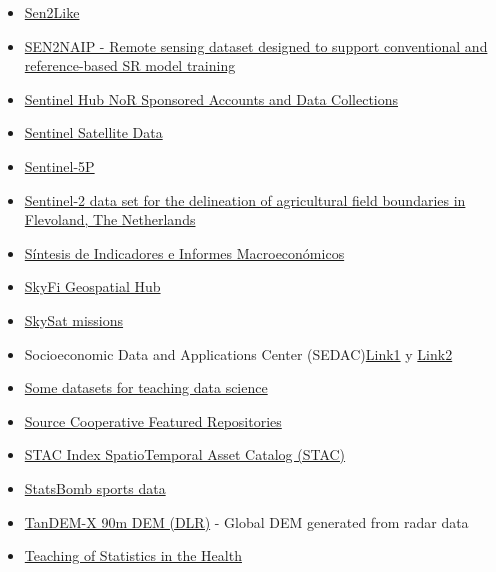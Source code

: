 \documentclass[
]{article}
\begin{document}
\begin{itemize}
{  images}
\item
  \href{https://docs.openeo.cloud/usecases/ard/sen2like/\#_1-sen2like-for-rgb}{Sen2Like}
\item
  \href{https://huggingface.co/datasets/isp-uv-es/SEN2NAIP}{SEN2NAIP -
  Remote sensing dataset designed to support conventional and
  reference-based SR model training}
\item
  \href{https://www.sentinel-hub.com/Network-of-Resources/}{Sentinel Hub
  NoR Sponsored Accounts and Data Collections}
\item
  \href{https://browser.dataspace.copernicus.eu}{Sentinel Satellite
  Data}
\item
  \href{https://developers.google.com/earth-engine/datasets/catalog/sentinel-5p}{Sentinel-5P}
\item
  \href{https://phys-techsciences.datastations.nl/dataset.xhtml?persistentId=doi:10.17026/dans-x8d-p6zm}{Sentinel-2
  data set for the delineation of agricultural field boundaries in
  Flevoland, The Netherlands}
\item
  \href{https://portal.mineco.gob.es/es-es/economiayempresa/EconomiaInformesMacro/Paginas/EconomiaInformesMacro.aspx}{Síntesis
  de Indicadores e Informes Macroeconómicos}
\item
  \href{https://skyfi.com/}{SkyFi Geospatial Hub}
\item
  \href{https://earth.esa.int/eogateway/missions/skysat}{SkySat
  missions}
\item
  Socioeconomic Data and Applications Center
  (SEDAC)\href{https://sedac.ciesin.columbia.edu/data/collection/gpw-v4/sets/browse}{Link1}
  y \href{https://earthdata.nasa.gov/centers/sedac-daac}{Link2}
\item
  \href{https://simplystatistics.org/posts/2018-01-22-the-dslabs-package-provides-datasets-for-teaching-data-science/}{Some
  datasets for teaching data science}
\item
  \href{https://beta.source.coop/}{Source Cooperative Featured
  Repositories}
\item
  \href{https://github.com/opengeos/stac-index-catalogs}{STAC Index
  SpatioTemporal Asset Catalog (STAC)}
\item
  \href{https://statsbomb.com/what-we-do/hub/free-data/}{StatsBomb
  sports data}
\item
  \href{https://download.geoservice.dlr.de/TDM90/}{TanDEM-X 90m DEM
  (DLR)} - Global DEM generated from radar data
\item
  \href{https://causeweb.org/tshs/}{Teaching of Statistics in the Health
}
\end{itemize}
\end{document}
